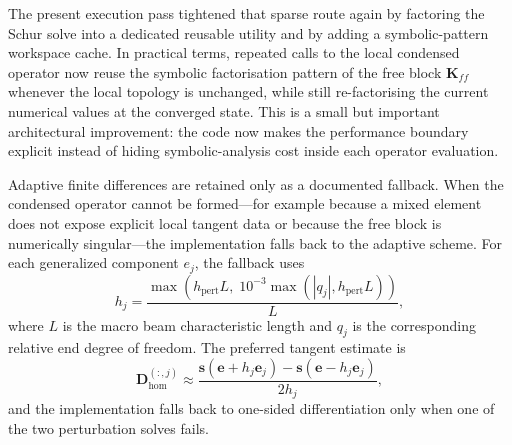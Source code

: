 The present execution pass tightened that sparse route again by factoring the
Schur solve into a dedicated reusable utility and by adding a symbolic-pattern
workspace cache.  In practical terms, repeated calls to the local condensed
operator now reuse the symbolic factorisation pattern of the free block
\(\mathbf{K}_{ff}\) whenever the local topology is unchanged, while still
re-factorising the current numerical values at the converged state.  This is a
small but important architectural improvement: the code now makes the
performance boundary explicit instead of hiding symbolic-analysis cost inside
each operator evaluation.

Adaptive finite differences are retained only as a documented fallback.  When
the condensed operator cannot be formed---for example because a mixed element
does not expose explicit local tangent data or because the free block is
numerically singular---the implementation falls back to the adaptive scheme.
For each generalized component \(e_j\), the fallback uses
\begin{equation}
  h_j
  =
  \frac{\max\!\left(h_{\mathrm{pert}} L,\;
  10^{-3}\max(|q_j|, h_{\mathrm{pert}}L)\right)}{L},
\end{equation}
where \(L\) is the macro beam characteristic length and \(q_j\) is the
corresponding relative end degree of freedom.  The preferred tangent estimate
is
\begin{equation}
  \mathbf{D}_{\mathrm{hom}}^{(:,j)}
  \approx
  \frac{\mathbf{s}(\mathbf{e}+h_j \mathbf{e}_j)
       -\mathbf{s}(\mathbf{e}-h_j \mathbf{e}_j)}{2h_j},
\end{equation}
and the implementation falls back to one-sided differentiation only when one of
the two perturbation solves fails.


